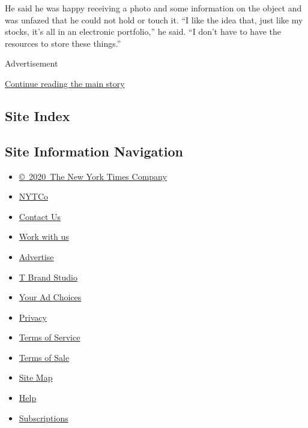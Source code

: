 He said he was happy receiving a photo and some information on the
object and was unfazed that he could not hold or touch it. ``I like the
idea that, just like my stocks, it's all in an electronic portfolio,''
he said. ``I don't have to have the resources to store these things.''

Advertisement

\protect\hyperlink{after-bottom}{Continue reading the main story}

\hypertarget{site-index}{%
\subsection{Site Index}\label{site-index}}

\hypertarget{site-information-navigation}{%
\subsection{Site Information
Navigation}\label{site-information-navigation}}

\begin{itemize}
\tightlist
\item
  \href{https://help.nytimes.com/hc/en-us/articles/115014792127-Copyright-notice}{©~2020~The
  New York Times Company}
\end{itemize}

\begin{itemize}
\tightlist
\item
  \href{https://www.nytco.com/}{NYTCo}
\item
  \href{https://help.nytimes.com/hc/en-us/articles/115015385887-Contact-Us}{Contact
  Us}
\item
  \href{https://www.nytco.com/careers/}{Work with us}
\item
  \href{https://nytmediakit.com/}{Advertise}
\item
  \href{http://www.tbrandstudio.com/}{T Brand Studio}
\item
  \href{https://www.nytimes.com/privacy/cookie-policy\#how-do-i-manage-trackers}{Your
  Ad Choices}
\item
  \href{https://www.nytimes.com/privacy}{Privacy}
\item
  \href{https://help.nytimes.com/hc/en-us/articles/115014893428-Terms-of-service}{Terms
  of Service}
\item
  \href{https://help.nytimes.com/hc/en-us/articles/115014893968-Terms-of-sale}{Terms
  of Sale}
\item
  \href{https://spiderbites.nytimes.com}{Site Map}
\item
  \href{https://help.nytimes.com/hc/en-us}{Help}
\item
  \href{https://www.nytimes.com/subscription?campaignId=37WXW}{Subscriptions}
\end{itemize}
